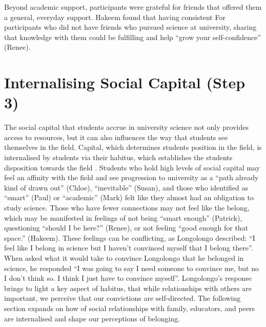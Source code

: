 Beyond academic support, participants were grateful for friends that offered them a general, everyday support. Hakeem found that having  consistent For participants who did not have friends who pursued science at university, sharing that knowledge with them could be fulfilling and help ``grow your self-confidence'' (Renee).



\section{Internalising Social Capital (Step 3)}
The social capital that students accrue in university science not only provides access to resources, but it can also influences the way that students see themselves in the field. Capital, which determines students position in the field, is internalised by students via their habitus, which establishes the students disposition towards the field \cite{Bourdieu1992}. Students who hold high levels of social capital may feel an affinity with the field and see progression to university as a ``path already kind of drawn out'' (Chloe), ``inevitable'' (Susan), and those who identified as ``smart'' (Paul) or ``academic'' (Mark) felt like they almost had an obligation to study science. Those who have fewer connections may not feel like the belong, which may be manifested in feelings of not being ``smart enough'' (Patrick), questioning ``should I be here?'' (Renee), or not feeling ``good enough for that space.'' (Hakeem). These feelings can be conflicting, as Longolongo described: ``I feel like I belong in science but I haven’t convinced myself that I belong there''. When asked what it would take to convince Longolongo that he belonged in science, he responded ``I was going to say I need someone to convince me, but no I don’t think so. I think I just have to convince myself''. Longolongo's response brings to light a key aspect of habitus, that while relationships with others are important, we perceive that our convictions are self-directed. The following section expands on how of social relationships with family, educators, and peers are internalised and shape our perceptions of belonging.
 


